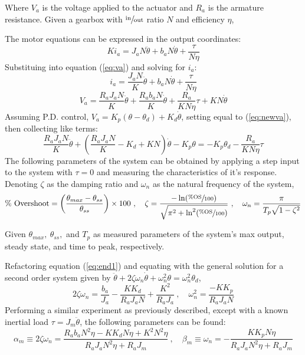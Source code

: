 \documentclass[12pt]{report}
\begin{document}
Where $V_a$ is the voltage applied to the actuator and $R_a$ is the armature resistance. Given a gearbox with $\sfrac{\text{in}}{\text{out}}$ ratio $N$ and efficiency $\eta$,

The motor equations can be expressed in the output coordinates:
\[
Ki_a = J_aN\ddot{\theta} + b_aN\dot{\theta} + \frac{\tau}{N\eta}
\]
Substituing into equation (\ref{eq:va}) and solving for $i_a$:
\[
  i_a = \frac{J_aN}{K}\ddot{\theta} + b_aN\dot{\theta} + \frac{\tau}{N\eta}
\]
\begin{equation}
  V_a = \frac{R_aJ_aN}{K}\ddot{\theta} + \frac{R_ab_aN}{K}\dot{\theta} + \frac{R_a}{KN\eta}\tau + KN\dot{\theta}
  \label{eq:newva}
\end{equation}
Assuming P.D. control, \(V_a = K_p(\theta-\theta_d) + K_d\dot{\theta}\), setting equal to (\ref{eq:newva}), then collecting like terms:
\begin{equation}
  \frac{R_aJ_aN}{K}\ddot{\theta} + \left( \frac{R_aJ_aN}{K} - K_d + KN \right)\dot{\theta} - K_p\theta = -K_p\theta_d - \frac{R_a}{KN\eta}\tau
  \label{eq:end1}
\end{equation}
\newpage
The following parameters of the system can be obtained by applying a step input to the system with $\tau=0$ and measuring the characteristics of it's response. Denoting $\zeta$ as the damping ratio and $\omega_n$ as the natural frequency of the system,
\[
  \text{\% Overshoot} = \left( \frac{\theta_{max} - \theta_{ss}}{\theta_{ss}} \right) \times 100~,\quad \zeta = \frac{-\ln(\sfrac{\%\text{OS}}{100})}{\sqrt{\pi^2 + \ln^2(\sfrac{\%\text{OS}}{100})}}~,\quad \omega_n = \frac{\pi}{T_p\sqrt{1-\zeta^2}}
\]

Given $\theta_{max},~\theta_{ss},$ and $T_p$ as measured parameters of the system's max output, steady state, and time to peak, respectively.

Refactoring equation (\ref{eq:end1}) and equating with the general solution for a second order system given by $\ddot{\theta} + 2\zeta\omega_n\dot{\theta} + \omega_n^2\theta = \omega_n^2\theta_d$,
\begin{equation}
  2\zeta\omega_n = \frac{b_a}{J_a} - \frac{KK_d}{R_aJ_aN} + \frac{K^2}{R_aJ_a}~,\quad
  \omega_n^2 = \frac{-KK_p}{R_aJ_aN}
\end{equation}
Performing a similar experiment as previously described, except with a known inertial load $\tau = J_m\ddot{\theta}$, the following parameters can be found:
\begin{equation}
  \alpha_m \equiv 2\zeta\omega_n = \frac{R_ab_aN^2\eta-KK_dN\eta+K^2N^2\eta}{R_aJ_aN^2\eta+R_aJ_m}~,\quad
  \beta_m \equiv \omega_n =-\frac{KK_pN\eta}{R_aJ_aN^2\eta+R_aJ_m}
\end{equation}
\end{document}
